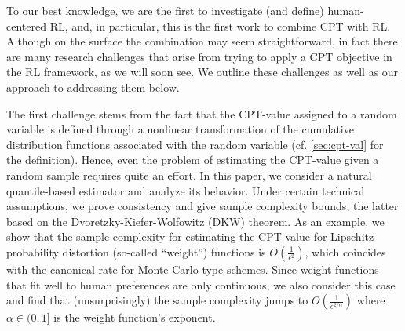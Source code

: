 To our best knowledge, we are the first to investigate (and define) human-centered RL, and, in particular, 
this is the first work to combine CPT with RL. Although on the surface the combination may seem straightforward, in fact there are many research challenges that arise from trying to apply a CPT objective in the RL framework, as we will soon see. 
We outline these challenges as well as our approach to addressing them below. 

The first challenge stems from the fact that the CPT-value assigned to a random variable is defined through a nonlinear transformation of the cumulative distribution functions associated with the random variable (cf. \cref{sec:cpt-val} for the definition). 
Hence, even the problem of estimating the CPT-value given a random sample requires quite an effort.
In this paper, we consider a natural quantile-based estimator and analyze its behavior.
Under certain technical assumptions, we prove consistency and give sample complexity bounds, the latter based on the
 Dvoretzky-Kiefer-Wolfowitz (DKW) theorem.
As an example, we show that the sample complexity for estimating the CPT-value 
for Lipschitz probability distortion (so-called ``weight'') functions is  $O\left(\frac1{\epsilon^2}\right)$, which coincides with the canonical rate for Monte Carlo-type schemes. Since weight-functions that fit well to human preferences are only  \holder continuous, we also consider this case and find that (unsurprisingly) the sample complexity  jumps to $O\left(\frac1{\epsilon^{2/\alpha}}\right)$ where $\alpha\in (0,1]$ is the weight function's \holder exponent.

